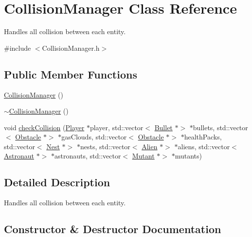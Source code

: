 \hypertarget{class_collision_manager}{}\section{Collision\+Manager Class Reference}
\label{class_collision_manager}


Handles all collision between each entity.  




{\ttfamily \#include $<$Collision\+Manager.\+h$>$}

\subsection*{Public Member Functions}
\begin{DoxyCompactItemize}
\item 
\hyperlink{class_collision_manager_a81f0b3f0cc0268c80f54714cd7ddb55f}{Collision\+Manager} ()
\item 
\hyperlink{class_collision_manager_acdbb3c842f0ef1c7a028d3f080855766}{$\sim$\+Collision\+Manager} ()
\item 
void \hyperlink{class_collision_manager_afc1b2d0d08aeed558617c071a68f0d98}{check\+Collision} (\hyperlink{class_player}{Player} $\ast$player, std\+::vector$<$ \hyperlink{class_bullet}{Bullet} $\ast$$>$ $\ast$bullets, std\+::vector$<$ \hyperlink{class_obstacle}{Obstacle} $\ast$$>$ $\ast$gas\+Clouds, std\+::vector$<$ \hyperlink{class_obstacle}{Obstacle} $\ast$$>$ $\ast$health\+Packs, std\+::vector$<$ \hyperlink{class_nest}{Nest} $\ast$$>$ $\ast$nests, std\+::vector$<$ \hyperlink{class_alien}{Alien} $\ast$$>$ $\ast$aliens, std\+::vector$<$ \hyperlink{class_astronaut}{Astronaut} $\ast$$>$ $\ast$astronauts, std\+::vector$<$ \hyperlink{class_mutant}{Mutant} $\ast$$>$ $\ast$mutants)
\end{DoxyCompactItemize}


\subsection{Detailed Description}
Handles all collision between each entity. 



\subsection{Constructor \& Destructor Documentation}
\mbox{\label{class_collision_manager_a81f0b3f0cc0268c80f54714cd7ddb55f}} 

